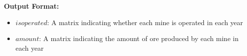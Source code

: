 \documentclass{article}
\begin{document}
\textbf{Output Format:}
\begin{itemize}
    \item $isoperated$: A matrix indicating whether each mine is operated in each year
    \item $amount$: A matrix indicating the amount of ore produced by each mine in each year
\end{itemize}
\end{document}
